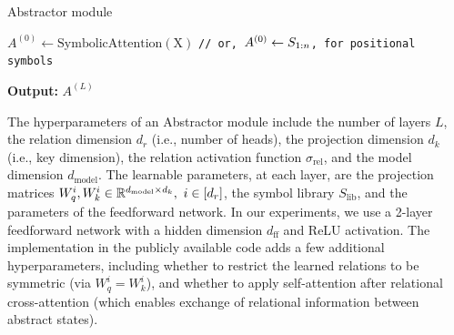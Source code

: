 \begin{algorithm}[ht!]
	\caption{Abstractor module}\label{alg:abstractor_module}

	\vspace{1em}

    $A^{(0)} \gets \mathrm{SymbolicAttention(X)}$ \quad \texttt{// or, $A^{(0)} \gets S_{1:n}$, for positional symbols}


    \textbf{Output:} $A^{(L)}$

\end{algorithm}

The hyperparameters of an Abstractor module include the number of layers $L$, the relation dimension $d_r$ (i.e., number of heads),  the projection dimension $d_k$ (i.e., key dimension), the relation activation function $\sigma_{\mathrm{rel}}$, and the model dimension $d_{\mathrm{model}}$. The learnable parameters, at each layer, are the projection matrices $W_q^{i}, W_k^{i} \in \mathbb{R}^{d_{\mathrm{model}} \times d_k}, \ i \in [d_r]$, the symbol library $S_{\mathrm{lib}}$, and the parameters of the feedforward network. In our experiments, we use a 2-layer feedforward network with a hidden dimension $d_{\mathrm{ff}}$ and ReLU activation. The implementation in the publicly available code adds a few additional hyperparameters, including whether to restrict the learned relations to be symmetric (via $W_q^{i} = W_k^{i}$), and whether to apply self-attention after relational cross-attention (which enables exchange of relational information between abstract states).


